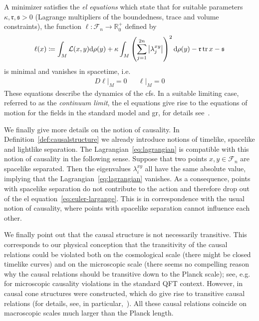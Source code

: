 \documentclass[reqno,11pt]{amsart}
\newcommand{\defeq}{\coloneqq}
\newcommand{\R}{\mathbb{R}}
\newcommand{\F}{{\mathcal{F}}}
\newcommand{\s}{{\mathfrak{s}}}
\renewcommand{\L}{{\mathcal{L}}}
\numberwithin{equation}{section}
\begin{document}
A minimizer satisfies the \textit{\ac{el} equations} which state that for suitable parameters $\kappa, \mathfrak{r}, \s > 0$
(Lagrange multipliers of the boundedness, trace and volume constraints),
the function $\ell: \F_n \rightarrow \R_0^+$ defined by
\begin{align}
    \label{eq:el-equation-l}
    \ell(x) \defeq \int_M \L(x,y) \dd\rho(y) + \kappa \int_M \left( \sum_{j=1}^{2n} \abs{\lambda^{xy}_j} \right)^2 \dd\rho(y) - \mathfrak{r} \tr x - \s
\end{align}
is minimal and vanishes in spacetime, i.e.
\begin{align}
    \label{eq:euler-largange}
    D\ell|_M = 0 && \ell|_M = 0
\end{align}
These equations describe the dynamics of the \ac{cfs}.
In a suitable limiting case, referred to as the \textit{continuum limit}, the \ac{el} equations
give rise to the equations of motion for the fields in the standard model and \ac{gr}, for details see~\cite{cfs}.

We finally give more details on the notion of causality.
In Definition~\ref{def:causalstructure} we already introduce notions of timelike, spacelike and lightlike separation.
The Lagrangian~\eqref{eq:lagrangian} is compatible with this notion of causality in the following sense.
Suppose that two points $x, y \in \F_n$ are spacelike separated.
Then the eigenvalues $\lambda^{xy}_i$ all have the same absolute value, implying that the Lagrangian~\eqref{eq:lagrangian} vanishes.
As a consequence, points with spacelike separation do not contribute to the action and therefore drop out of the
\ac{el} equation~\eqref{eq:euler-largange}.
This is in correspondence with the usual notion of causality, where points with spacelike separation cannot influence each other.

We finally point out that the causal structure is not necessarily transitive.
This corresponds to our physical conception that the transitivity of the causal relations could be violated both on the
cosmological scale (there might be closed timelike curves) and on the microscopic scale (there seems no compelling reason
why the causal relations should be transitive down to the Planck scale); see, e.g.~\cite{anselmi2007renormalization,anselmi2019fakeons,anselmi2018quantum} for microscopic causality violations
in the standard QFT context.
However, in~\cite{Dappiaggi2020, Finster2023} causal cone structures were constructed, which do give rise to transitive causal relations
(for details, see, in particular,~\cite[section 4.1]{Dappiaggi2020}).
All these causal relations coincide on macroscopic scales much larger than the Planck length.
    
\end{document}
